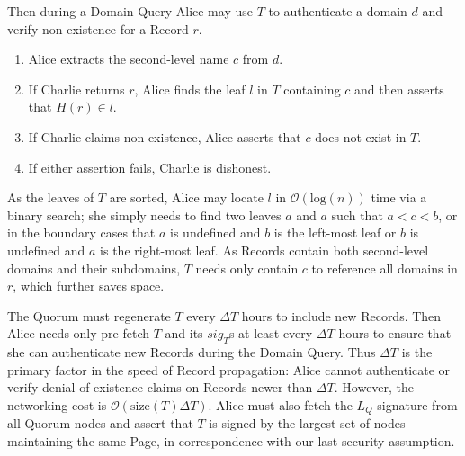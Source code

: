 \documentclass{sig-alternate}
\begin{document}
Then during a Domain Query Alice may use $ T $ to authenticate a domain $ d $ and verify non-existence for a Record $ r $.

\begin{enumerate}
	\item Alice extracts the second-level name $ c $ from $ d $.
	\item If Charlie returns $ r $, Alice finds the leaf $ l $ in $ T $ containing $ c $ and then asserts that $ H(r) \in l $.
	\item If Charlie claims non-existence, Alice asserts that $ c $ does not exist in $ T $.
	\item If either assertion fails, Charlie is dishonest.
\end{enumerate}

As the leaves of $ T $ are sorted, Alice may locate $ l $ in $ \mathcal{O}(\mathrm{log}(n)) $ time via a binary search; she simply needs to find two leaves $ a $ and $ a $ such that $ a < c < b $, or in the boundary cases that $ a $ is undefined and $ b $ is the left-most leaf or $ b $ is undefined and $ a $ is the right-most leaf. As Records contain both second-level domains and their subdomains, $ T $ needs only contain $ c $ to reference all domains in $ r $, which further saves space. 

The Quorum must regenerate $ T $ every $ \Delta T $ hours to include new Records. Then Alice needs only pre-fetch $ T $ and its $ \mathit{sig}_{T} $s at least every $ \Delta T $ hours to ensure that she can authenticate new Records during the Domain Query. Thus $ \Delta T $ is the primary factor in the speed of Record propagation: Alice cannot authenticate or verify denial-of-existence claims on Records newer than $ \Delta T $. However, the networking cost is $ \mathcal{O}(\mathrm{size}(T) \Delta T) $. Alice must also fetch the $ L_{Q} $ signature from all Quorum nodes and assert that $ T $ is signed by the largest set of nodes maintaining the same Page, in correspondence with our last security assumption.

\end{document}
